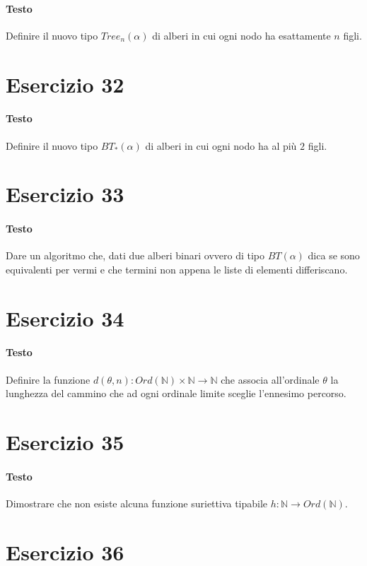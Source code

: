 \documentclass[a4paper,10pt]{article}
\begin{document}
\paragraph{Testo}
Definire il nuovo tipo $Tree_n(\alpha)$ di alberi in cui ogni nodo ha esattamente $n$ figli.

\section*{Esercizio 32}
\paragraph{Testo}
Definire il nuovo tipo $BT_\ast (\alpha)$ di alberi in cui ogni nodo ha al più $2$ figli.

\section*{Esercizio 33}
\paragraph{Testo}
Dare un algoritmo che, dati due alberi binari ovvero di tipo $BT(\alpha)$ dica se sono equivalenti per vermi e che termini non appena le liste di elementi differiscano.

\section*{Esercizio 34}
\paragraph{Testo}
Definire la funzione $d(\theta, n) : Ord(\mathbb{N}) \times \mathbb{N} \rightarrow \mathbb{N}$ che associa all’ordinale $\theta$ la lunghezza del cammino che ad ogni ordinale limite sceglie l’ennesimo percorso.

\section*{Esercizio 35}
\paragraph{Testo}
Dimostrare che non esiste alcuna funzione suriettiva tipabile $h : \mathbb{N} \rightarrow Ord(\mathbb{N})$.

\section*{Esercizio 36}
\end{document}
